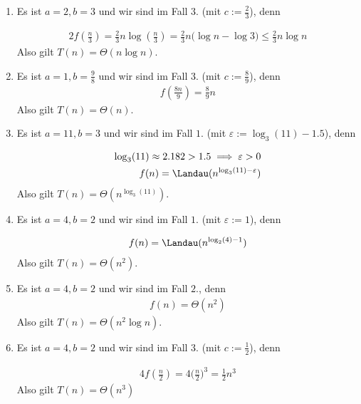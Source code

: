\begin{solution}
\phantom{}

\begin{enumerate}[label = \alph*]
  \item Es ist $a = 2, b = 3$ und wir sind im Fall $3.$ (mit $c := \frac{2}{3}$), denn

    \begin{align*}
      2f(\frac{n}{3})
      =
      \frac{2}{3}n \log(\frac{n}{3})
      =
      \frac{2}{3}n \Big( \log n - \log 3\Big)
      \leq
      \frac{2}{3} n\log n
    \end{align*}
  Also gilt $T(n) = \Theta(n\log n)$.

  \item Es ist $a = 1, b = \frac{9}{8}$ und wir sind im Fall $3.$ (mit $c := \frac{8}{9}$), denn
    \begin{align*}
      f(\frac{8n}{9})
      =
      \frac{8}{9}n
    \end{align*}
  Also gilt $T(n) = \Theta(n)$.

  \item Es ist $a = 11, b = 3$ und wir sind im Fall $1.$ (mit $\varepsilon := \log_3(11)-1.5$), denn

    \begin{align*}
      \log_3(11) \approx 2.182 > 1.5 \implies \varepsilon > 0 \\
      f(n)
      =
      \Landau(n^{\log_3(11)-\varepsilon})
    \end{align*}
  Also gilt $T(n) = \Theta(n^{\log_3(11)})$.

  \item Es ist $a = 4, b = 2$ und wir sind im Fall $1.$ (mit $\varepsilon := 1$), denn

    \begin{align*}
      f(n)
      =
      \Landau(n^{\log_2(4)-1})
    \end{align*}
  Also gilt $T(n) = \Theta(n^2)$.

  \item Es ist $a = 4, b = 2$ und wir sind im Fall $2.$, denn
    \begin{align*}
      f(n) = \Theta(n^2)
    \end{align*}
  Also gilt $T(n) = \Theta(n^2 \log n)$.

  \item Es ist $a = 4, b = 2$ und wir sind im Fall $3.$ (mit $c := \frac{1}{2}$), denn

    \begin{align*}
      4f(\frac{n}{2})
      =
      4 \Big(\frac{n}{2}\Big)^3
      =
      \frac{1}{2} n^3
    \end{align*}
  Also gilt $T(n) = \Theta(n^3)$
\end{enumerate}

\end{solution}

